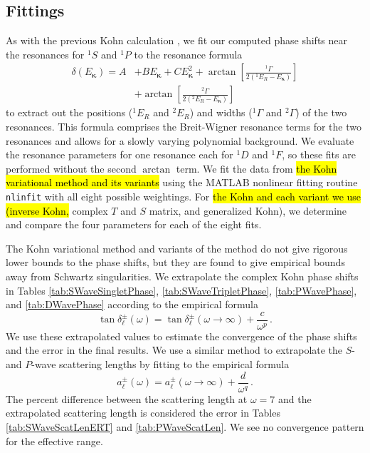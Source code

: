 \documentclass[preprint,showpacs,showkeys,preprintnumbers,amsmath,amssymb,longbibliography,pra,aps]{revtex4-1}
\begin{document}
{\subsection{Fittings}
As with the previous Kohn calculation \cite{VanReeth2004},
we fit our computed phase shifts near the resonances for
$^1S$ and $^1P$ to the resonance formula
\begin{align}
\label{eq:ResonanceFit}
\delta(E_{\bm \kappa}) = A &+ B E_{\bm \kappa} + C E_{\bm \kappa}^2 + \arctan
  \left[ \frac{^1\Gamma}{2(^1E_R - E_{\bm \kappa})} \right]  \nonumber \\
& + \arctan \left[ \frac{^2\Gamma}{2(^2E_R - E_{\bm \kappa})} \right]
\end{align}
to extract out the positions ($^1E_R$ and $^2E_R$) and widths ($^1\Gamma$ and 
$^2\Gamma$) of the two resonances. This formula comprises the
Breit-Wigner resonance terms
\cite{VanReeth2004,Breit1936,Macek1970,Hazi1979} for the two
resonances and allows for a slowly varying polynomial background.
We evaluate the resonance parameters for one resonance each for $^1D$ and
$^1F$, so these fits are performed without the second $\arctan$ term.
We fit the data from \hl{the Kohn variational method and its variants}
using the MATLAB \cite{MATLAB} nonlinear fitting routine 
\texttt{nlinfit} with all eight possible weightings. For \hl{the Kohn and
each variant we use (inverse Kohn,} complex $T$ and $S$ matrix,
and generalized Kohn), we determine and compare the four parameters for each
of the eight fits.

The Kohn variational method and variants of the method do not give 
rigorous lower bounds to the phase shifts, but they are found to give 
empirical bounds
away from Schwartz singularities. We extrapolate the complex Kohn phase
shifts in Tables \ref{tab:SWaveSingletPhase}, \ref{tab:SWaveTripletPhase},
\ref{tab:PWavePhase}, and \ref{tab:DWavePhase} according to the 
empirical formula \cite{Armour1991,VanReeth2003}
\begin{equation}
\label{eq:Extrap}
\tan\delta_\ell^\pm(\omega) = \tan\delta_\ell^\pm(\omega\to\infty) +
  \frac{c}{\omega^p}\, .
\end{equation}
We use these extrapolated values to estimate the convergence of the phase 
shifts and the error in the final results. We use a similar method to
extrapolate the $S$- and $P$-wave scattering lengths by fitting to the
empirical formula \cite{VanReeth2003}
\begin{equation}
\label{eq:ExtrapA}
a_\ell^\pm(\omega) = a_\ell^\pm(\omega\to\infty) + \frac{d}{\omega^q}\, .
\end{equation}
The percent difference between the scattering length at $\omega = 7$
and the extrapolated scattering 
length is considered the error in Tables \ref{tab:SWaveScatLenERT} and
\ref{tab:PWaveScatLen}. We see no convergence pattern for the effective range.

}
\end{document}
